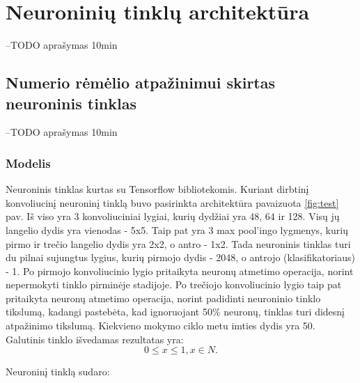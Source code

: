 \documentclass{VUMIFInfBakalaurinis}
\begin{document}
\pagebreak
\section{Neuroninių tinklų architektūra}
--TODO
aprašymas 10min


\subsection{Numerio rėmėlio atpažinimui skirtas neuroninis tinklas}
--TODO
aprašymas 10min

\subsubsection{Modelis}
Neuroninis tinklas kurtas su Tensorflow bibliotekomis.
Kuriant dirbtinį konvoliucinį neuroninį tinklą buvo pasirinkta architektūra pavaizuota \ref{fig:test} pav.
Iš viso yra 3 konvoliuciniai lygiai, kurių dydžiai yra 48, 64 ir 128\cite{goodfellow2013multi}.
Visų jų langelio dydis yra vienodas - 5x5.
Taip pat yra 3 max pool'ingo lygmenys, kurių pirmo ir trečio langelio dydis yra 2x2, o antro - 1x2.
Tada neuroninis tinklas turi du pilnai sujungtus lygius, kurių pirmojo dydis - 2048, o antrojo (klasifikatoriaus) - 1.
Po pirmojo konvoliucinio lygio pritaikyta neuronų atmetimo operacija, norint nepermokyti tinklo pirminėje stadijoje.
Po trečiojo konvoliucinio lygio taip pat pritaikyta neuronų atmetimo operacija, norint padidinti neuroninio tinklo tikslumą, 
kadangi pastebėta, kad ignoruojant 50\% neuronų, tinklas turi didesnį atpažinimo tikslumą\cite{stark2015captcha}.
Kiekvieno mokymo ciklo metu imties dydis yra 50. Galutinis tinklo išvedamas rezultatas yra:
\begin{equation*}
  0 \leq x \leq 1, x \in N.
\end{equation*}

Neuroninį tinklą sudaro:
\end{document}
